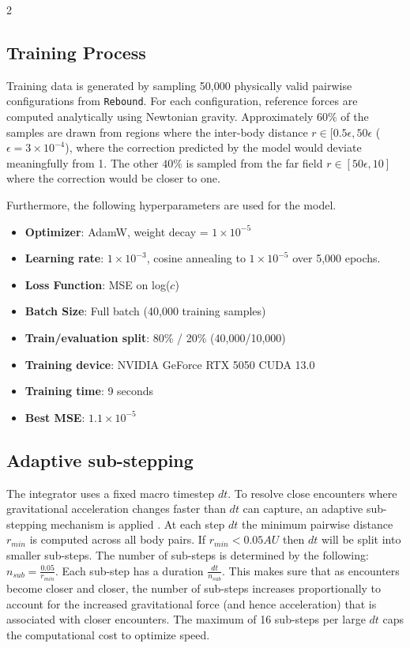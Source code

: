 \documentclass{article}
\begin{document}
\begin{multicols}{2}
\subsection{Training Process}
Training data is generated by sampling 50,000 physically valid pairwise configurations from \texttt{Rebound}. For each configuration, reference forces are computed analytically using Newtonian gravity. Approximately $60\%$ of the samples are drawn from regions where the inter-body distance $r\in [0.5 \epsilon, 50 \epsilon$ ($\epsilon = 3 \times10^{-4}$), where the correction predicted by the model would deviate meaningfully from 1. The other $40\%$ is sampled from the far field $r\in[50\epsilon, 10]$ where the correction would be closer to one.

Furthermore, the following hyperparameters are used for the model.
\begin{itemize}
    \item \textbf{Optimizer}: AdamW, weight decay = $1\times10^{-5}$
    \item \textbf{Learning rate}: $1\times10^{-3}$, cosine annealing to $1\times10^{-5}$ \cite{loshchilov2017sgdr} over 5,000 epochs.
    \item \textbf{Loss Function}: MSE on log($c$)
    \item \textbf{Batch Size}: Full batch (40,000 training samples)
    \item \textbf{Train/evaluation split}: 80\% / 20\% (40,000/10,000)
    \item \textbf{Training device}: NVIDIA GeForce RTX 5050 CUDA 13.0
    \item \textbf{Training time}: 9 seconds
    \item \textbf{Best MSE}: $1.1 \times 10^{-5}$
\end{itemize}

\subsection{Adaptive sub-stepping}
The integrator uses a fixed macro timestep $dt$. To resolve close encounters where gravitational acceleration changes faster than $dt$ can capture, an adaptive sub-stepping mechanism is applied \cite{Rein_2014}. At each step $dt$ the minimum pairwise distance $r_{min}$ is computed across all body pairs. If $r_{min} <0.05 AU$ then $dt$ will be split into smaller sub-steps. The number of sub-steps is determined by the following: $n_{sub}=\frac{0.05}{r_{min}}$. Each sub-step has a duration $\frac{dt}{n_{sub}}$. This makes sure that as encounters become closer and closer, the number of sub-steps increases proportionally to account for the increased gravitational force (and hence acceleration) that is associated with closer encounters. The maximum of 16 sub-steps per large $dt$ caps the computational cost to optimize speed.


\end{multicols}
\end{document}
